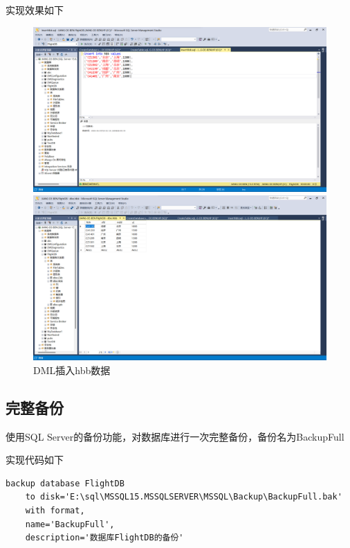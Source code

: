 \documentclass[UTF8,12pt]{article}
\begin{document}
实现效果如下
\begin{figure}[htbp]
	\centering
	\begin{minipage}{0.7\linewidth}
		\centering
		\includegraphics[width=0.9\linewidth]{img/3.png}
	\end{minipage}
	\begin{minipage}{0.7\linewidth}
		\centering
		\includegraphics[width=0.9\linewidth]{img/4.png}
	\end{minipage}
    \caption{DML插入hbb数据}
\end{figure}

\subsection{完整备份}
使用SQL Server的备份功能，对数据库进行一次完整备份，备份名为BackupFull

实现代码如下
\begin{lstlisting}[title=完整备份,frame=shadowbox]
    backup database FlightDB
    to disk='E:\sql\MSSQL15.MSSQLSERVER\MSSQL\Backup\BackupFull.bak'
    with format,
    name='BackupFull',
    description='数据库FlightDB的备份'
\end{lstlisting}
\end{document}
